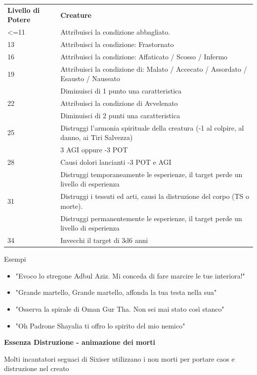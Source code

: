 \documentclass[a4paper,10 pt,twoside,openany]{book}
\begin{document}
\bigskip

\begin{tabularx}{0.95\textwidth}{lX}
	\toprule
	\textbf{Livello di Potere} & \textbf{Creature}\\
	<=11  & Attribuisci la condizione abbagliato.  \\
	13    & Attribuisci la condizione: Frastornato    \\
	16    & Attribuisci la condizione: Affaticato / Scosso / Infermo  \\
	19    & Attribuisci la condizione di: Malato / Accecato / Assordato / Esausto / Nauseato\\
	& Diminuisci di 1 punto una caratteristica   \\
	22    & Attribuisci la condizione di Avvelenato    \\
	& Diminuisci di 2 punti una caratteristica   \\
	25    & Distruggi l’armonia spirituale della creatura (-1 al colpire, al danno, ai Tiri Salvezza)\\
	& 3 AGI oppure -3 POT  \\
	28    & Causi dolori lancianti -3 POT e AGI  \\
	& Distruggi temporaneamente le esperienze, il target perde un livello di esperienza \\
	31    & Distruggi i tessuti ed arti, causi la distruzione del corpo (TS o morte). \\
	& Distruggi permanentemente le esperienze, il target perde un livello di esperienza \\
	34    & Invecchi il target di 3d6 anni \\
\end{tabularx}

\bigskip

Esempi
\begin{itemize}
	\item
	"Evoco lo stregone Adbul Aziz. Mi conceda di fare marcire le tue interiora!"
	\item
	"Grande martello, Grande martello, affonda la tua testa nella sua"
	\item
	"Osserva la spirale di Oman Gur Tha. Non sei mai stato così stanco"
	\item
	"Oh Padrone Shayalia ti offro lo spirito del mio nemico"
\end{itemize}

\bigskip

\textbf{Essenza Distruzione - animazione dei morti}

Molti incantatori seguaci di Sixiser utilizzano i non morti per portare caos e distruzione nel creato
\end{document}
